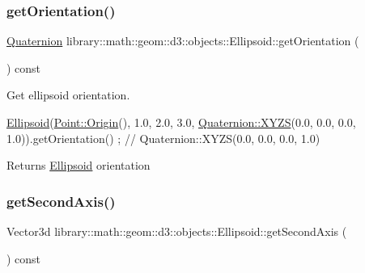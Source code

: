 \subsubsection{\texorpdfstring{get\+Orientation()}{getOrientation()}}
{\footnotesize\ttfamily \hyperlink{classlibrary_1_1math_1_1geom_1_1d3_1_1trf_1_1rot_1_1_quaternion}{Quaternion} library\+::math\+::geom\+::d3\+::objects\+::\+Ellipsoid\+::get\+Orientation (\begin{DoxyParamCaption}{ }\end{DoxyParamCaption}) const}



Get ellipsoid orientation. 


\begin{DoxyCode}
\hyperlink{classlibrary_1_1math_1_1geom_1_1d3_1_1objects_1_1_ellipsoid_aae81fe0edc7f0e8d4590ea89ae73cb14}{Ellipsoid}(\hyperlink{classlibrary_1_1math_1_1geom_1_1d3_1_1objects_1_1_point_ab2a38e285c562e50bf350272c083986f}{Point::Origin}(), 1.0, 2.0, 3.0, \hyperlink{classlibrary_1_1math_1_1geom_1_1d3_1_1trf_1_1rot_1_1_quaternion_a006294eb483bcfc352c2dc36cf19ceec}{Quaternion::XYZS}(0.0, 0.0, 
      0.0, 1.0)).getOrientation() ; \textcolor{comment}{// Quaternion::XYZS(0.0, 0.0, 0.0, 1.0)}
\end{DoxyCode}


\begin{DoxyReturn}{Returns}
\hyperlink{classlibrary_1_1math_1_1geom_1_1d3_1_1objects_1_1_ellipsoid}{Ellipsoid} orientation 
\end{DoxyReturn}
\mbox{\label{classlibrary_1_1math_1_1geom_1_1d3_1_1objects_1_1_ellipsoid_a33dde96894c213da77ee116ff18fdf86}} 
\subsubsection{\texorpdfstring{get\+Second\+Axis()}{getSecondAxis()}}
{\footnotesize\ttfamily Vector3d library\+::math\+::geom\+::d3\+::objects\+::\+Ellipsoid\+::get\+Second\+Axis (\begin{DoxyParamCaption}{ }\end{DoxyParamCaption}) const}



